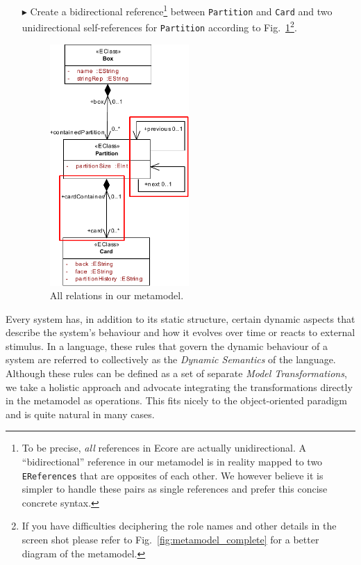 \begin{enumerate}
\item[$\blacktriangleright$] Create a bidirectional reference\footnote{To be precise, \emph{all} references in Ecore are actually unidirectional.
A ``bidirectional'' reference in our metamodel is in reality mapped to two \texttt{EReferences} that are opposites of each other.
We however believe it is simpler to handle these pairs as single references and prefer this concise concrete syntax.} between \texttt{Partition} and \texttt{Card} and two unidirectional self-references for \texttt{Partition} according to Fig.~\ref{fig:ereferences_all}\footnote{If you have difficulties deciphering the role names and other details in the screen shot please refer to Fig.~\ref{fig:metamodel_complete} for a better diagram of the metamodel.}.

\begin{figure}[htbp]
	\centering
  \includegraphics[width=0.5\textwidth]{pics/memBoxBilder/memBox34.pdf}
	\caption{All relations in our metamodel.}
	\label{fig:ereferences_all}
\end{figure}
\end{enumerate}
\FloatBarrier

Every system has, in addition to its static structure, certain dynamic aspects that describe the system's behaviour and how it evolves over time or reacts to external stimulus.
In a language, these rules that govern the dynamic behaviour of a system are referred to collectively as the \emph{Dynamic Semantics} of the language.
Although these rules can be defined as a set of separate \emph{Model Transformations}, we take a holistic approach and advocate integrating the transformations directly in the metamodel as operations.
This fits nicely to the object-oriented paradigm and is quite natural in many cases.

